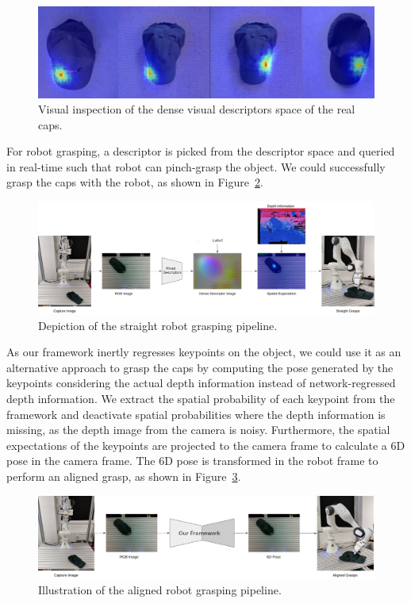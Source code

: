 \begin{figure}[htb]
    \centering
    \includegraphics[scale=0.15]{images/test_real_caps.png}
    \caption{Visual inspection of the dense visual descriptors space of the real caps.}
    \label{fig:check_real_caps}
\end{figure}

For robot grasping, a descriptor is picked from the descriptor space and queried in real-time such that robot can pinch-grasp the object.
We could successfully grasp the caps with the robot, as shown in Figure~\ref{fig:straight_grasp}.

\begin{figure}[htb]
    \centering
    \includegraphics[scale=0.15]{images/straight_grasps.png}
    \caption{Depiction of the straight robot grasping pipeline.}
    \label{fig:straight_grasp}
\end{figure}

As our framework inertly regresses keypoints on the object, we could use it as an alternative approach to grasp the caps by computing the pose
generated by the keypoints considering the actual depth information instead of network-regressed depth information.
We extract the spatial probability of each keypoint from the framework and deactivate spatial probabilities where the depth information is missing,
as the depth image from the camera is noisy. Furthermore, the spatial expectations of the keypoints are projected to the camera frame
to calculate a 6D pose in the camera frame. The 6D pose is transformed in the robot frame to perform an aligned grasp, as shown in Figure~\ref{fig:aligned_grasp}.

\begin{figure}[htb]
    \centering
    \includegraphics[scale=0.17]{images/aligned.png}
    \caption{Illustration of the aligned robot grasping pipeline.}
    \label{fig:aligned_grasp}
\end{figure}